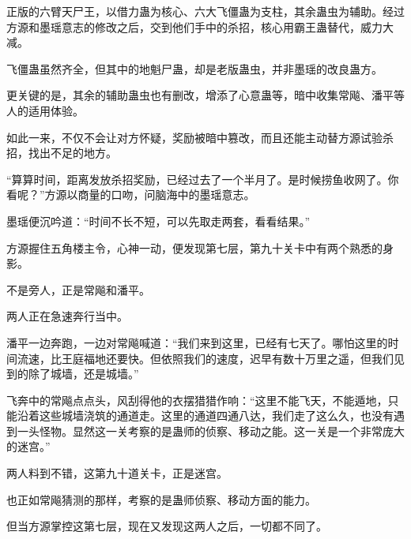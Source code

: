 \begin{this_body}
正版的六臂天尸王，以借力蛊为核心、六大飞僵蛊为支柱，其余蛊虫为辅助。经过方源和墨瑶意志的修改之后，交到他们手中的杀招，核心用霸王蛊替代，威力大减。

飞僵蛊虽然齐全，但其中的地魁尸蛊，却是老版蛊虫，并非墨瑶的改良蛊方。

更关键的是，其余的辅助蛊虫也有删改，增添了心意蛊等，暗中收集常飚、潘平等人的适用体验。

如此一来，不仅不会让对方怀疑，奖励被暗中篡改，而且还能主动替方源试验杀招，找出不足的地方。

“算算时间，距离发放杀招奖励，已经过去了一个半月了。是时候捞鱼收网了。你看呢？”方源以商量的口吻，问脑海中的墨瑶意志。

墨瑶便沉吟道：“时间不长不短，可以先取走两套，看看结果。”

方源握住五角楼主令，心神一动，便发现第七层，第九十关卡中有两个熟悉的身影。

不是旁人，正是常飚和潘平。

两人正在急速奔行当中。

潘平一边奔跑，一边对常飚喊道：“我们来到这里，已经有七天了。哪怕这里的时间流速，比王庭福地还要快。但依照我们的速度，迟早有数十万里之遥，但我们见到的除了城墙，还是城墙。”

飞奔中的常飚点点头，风刮得他的衣摆猎猎作响：“这里不能飞天，不能遁地，只能沿着这些城墙浇筑的通道走。这里的通道四通八达，我们走了这么久，也没有遇到一头怪物。显然这一关考察的是蛊师的侦察、移动之能。这一关是一个非常庞大的迷宫。”

两人料到不错，这第九十道关卡，正是迷宫。

也正如常飚猜测的那样，考察的是蛊师侦察、移动方面的能力。

但当方源掌控这第七层，现在又发现这两人之后，一切都不同了。

\end{this_body}


